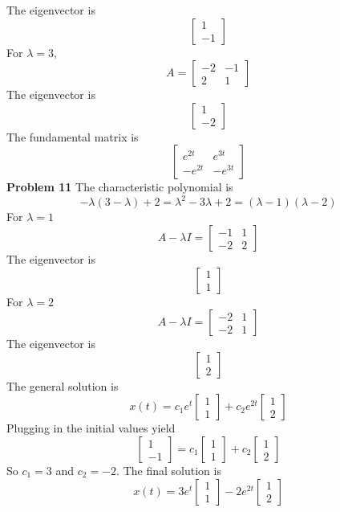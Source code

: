 The eigenvector is 
\[
    \begin{bmatrix}
        1 \\ -1
    \end{bmatrix}
\]
For $\lambda = 3$,
\[
    A = \begin{bmatrix}
        -2 & -1 \\
        2 & 1
    \end{bmatrix}
\]
The eigenvector is 
\[
    \begin{bmatrix}
        1 \\ -2
    \end{bmatrix}
\]
The fundamental matrix is 
\[
    \begin{bmatrix}
        e^{2t} & e^{3t} \\
        -e^{2t} & -e^{3t}
    \end{bmatrix}
\]
\textbf{Problem 11}
The characteristic polynomial is 
\[
    -\lambda(3-\lambda) + 2
    = \lambda^2-3\lambda+2
    = (\lambda-1)(\lambda-2)
\]
For $\lambda=1$
\[
    A-\lambda I = \begin{bmatrix}
        -1 & 1 \\
        -2 & 2
    \end{bmatrix}
\]
The eigenvector is 
\[
    \begin{bmatrix}
        1 \\ 1
    \end{bmatrix}
\]
For $\lambda=2$
\[
    A-\lambda I = \begin{bmatrix}
        -2 & 1 \\
        -2 & 1
    \end{bmatrix}
\]
The eigenvector is 
\[
    \begin{bmatrix}
        1 \\ 2
    \end{bmatrix}
\]
The general solution is 
\[
    x(t) = c_1e^t
    \begin{bmatrix}
        1 \\ 1
    \end{bmatrix} +
    c_2e^{2t}
    \begin{bmatrix}
        1 \\ 2
    \end{bmatrix}
\]
Plugging in the initial values yield 
\[
    \begin{bmatrix}
        1 \\ -1
    \end{bmatrix} 
    =
    c_1
    \begin{bmatrix}
        1 \\ 1
    \end{bmatrix} +
    c_2
    \begin{bmatrix}
        1 \\ 2
    \end{bmatrix}
\]
So $c_1 = 3$ and $c_2 = -2$.
The final solution is 
\[
    x(t) = 3e^t
    \begin{bmatrix}
        1 \\ 1
    \end{bmatrix} -
    2e^{2t}
    \begin{bmatrix}
        1 \\ 2
    \end{bmatrix}
\]